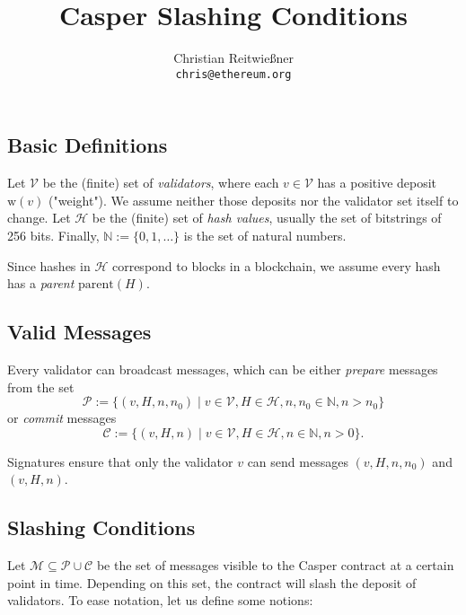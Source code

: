 \documentclass[11pt,letterpaper]{article}
\date{}
\newcommand{\uint}{\mathbb{N}}
\newcommand{\eqdef}{:=}
\newcommand{\validators}{\mathcal{V}}
\newcommand{\messages}{\mathcal{M}}
\begin{document}


\title{Casper Slashing Conditions}

\author{Christian Reitwießner \\
{\tt chris@ethereum.org}}


\maketitle

\subsection*{Basic Definitions}

Let $\validators$ be the (finite) set of \emph{validators}, where each
$v \in \validators$ has a positive deposit $\mathrm{w}(v)$ ("weight"). We assume neither those
deposits nor the validator set itself to change.
Let $\mathcal{H}$ be the (finite) set of \emph{hash values}, usually
the set of bitstrings of 256 bits. Finally, $\uint \eqdef \{0, 1, \dots\}$
is the set of natural numbers.

Since hashes in $\mathcal{H}$ correspond to blocks in a blockchain, we assume every hash
has a \emph{parent} $\mathrm{parent}(H)$.

\subsection*{Valid Messages}

Every validator can broadcast messages, which can be either \emph{prepare} messages from
the set
\[
  \mathcal{P} \eqdef \{(v, H, n, n_0) \mid
  v \in \validators, H \in \mathcal{H}, n,n_0 \in \uint,
  n > n_0
  \}
\]
or \emph{commit} messages
\[
  \mathcal{C} \eqdef \{(v, H, n) \mid
  v \in \validators, H \in \mathcal{H}, n \in \uint, n > 0\}.
\]

Signatures ensure that only the validator $v$ can send messages $(v, H, n, n_0)$
and $(v, H, n)$.

\subsection*{Slashing Conditions}

Let $\messages \subseteq \mathcal{P} \cup \mathcal{C}$ be the set of messages
visible to the Casper contract at a certain point in time. Depending on
this set, the contract will slash the deposit of validators. To ease notation,
let us define some notions:
\end{document}
